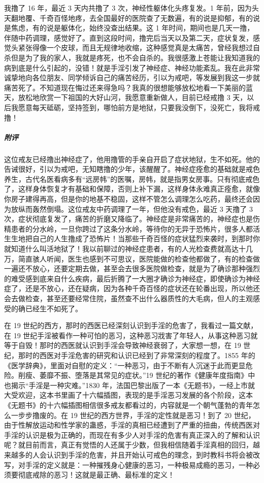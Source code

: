 \begin{case}
    我撸了 16 年，最近 3 天内共撸了 3 次，神经性躯体化头疼复发。1 年前，因为头天翻地覆、千奇百怪地疼，去全国最好的医院查了无数遍，有的说是抑郁，有的说是焦虑，有的说是躯体化，始终没查出结果。这 1 年时间，期间也是几天一撸，伴随中药调理，感觉好了。直到这段时间，撸完后当天以及第二天，症状复发，感觉头紧张得像一个皮球，而且无规律地收缩，这种感觉真是太痛苦，曾经我想过自杀但是为了我的家人，我就是疼死，也不会自杀的。我很感激上苍能让我知道我的病到底是什么引起的，没错！就是手淫引发了神经症、神经功能紊乱。我在此非常诚挚地向各位朋友、同学倾诉自己的痛苦经历，引以为戒吧，等发展到我这一步就痛苦死了。不知道现在悔过还来得急吗？我真的很想能够放松地看一下美丽的蓝天，放松地欣赏一下祖国的大好山河，我愿意重新做人，目前已经戒撸 3 天，以后我愿意每天砥砺，坚持签到，哪怕前方是地狱，只要我没倒下，没死亡，我将戒撸！
    \subparagraph{附评} 这位戒友已经撸出神经症了，他用撸管的手亲自开启了症状地狱，生不如死。他的告诫很好，引以为戒吧，无知瞎撸的少年，该醒醒了。神经症痊愈的基础就是戒色养生，古代名医看病多有“远房帏”的医嘱，房帏，就是指男女房事。只有彻底戒色了，这样身体恢复才有基础和保障，否则上补下漏，这样身体永难真正痊愈，就像你房子建得再高，但是你的地基不稳固，这样不管怎么调理怎么吃药，最终还会因为放纵而轰然倒塌。这位戒友中药调理了一年，但他没有戒色，最近 3 天撸了 3 次，症状彻底复发了，痛苦的折磨又降临了。神经症是非常痛苦的，神经症也是伤精患者的分水岭，一旦你跨过了这条分水岭，等待你的无异于恐怖片，很多人都活生生地把自己的人生撸成了恐怖片！当那些千奇百怪的症状猛烈来袭时，到那时你就知道什么叫活地狱了！我以前聊过的神经症患者，有的人光检查费就高达十几万，简直骇人听闻，医生也感到不可思议，医院能做的检查他都做了，有的检查做一遍还不放心，还要定期去做，甚至会去很多医院做检查，就是为了确诊那种强烈的难受感到底来自什么疾病，最后折腾了一大圈才确诊为神经症，即使确诊为神经症了，还是不放心，还在疑病，因为各种千奇百怪的症状还在轮番出现，所以他还会去做检查，甚至还要经常住院，虽然查不出什么器质性的大毛病，但人的主观感受的确已经生不如死了。

    在 19 世纪的西方，那时的西医已经深刻认识到手淫的危害了，我看过一篇文献，在 19 世纪手淫被看作一种可怕的恶习，这种恶习戕害了年轻人，从事这种恶习就等于自毁！那时的西医就认识到手淫会导致神经衰弱了，大家想一想，在 19 世纪，那时的西医对手淫危害的研究和认识已经到了非常深刻的程度了。1855 年的《医学辞典》，里面对自慰的定义：“一种恶习，由于不断有人沉迷于此而更显危险。削瘦、萎靡不振、堕落是其常见的症状。”19 世纪的著作《健康年度指南》中也揭示“手淫是一种灾难。”1830 年，法国巴黎出版了一本《无题书》，一经上市就大受欢迎，这本书里画了十六幅插图，表现的是手淫恶习发展的各个阶段，这本《无题书》的十六幅插图相信很多戒友都看过的，内容就是一个朝气蓬勃的青年怎么一步步撸废的。在 19 世纪的西方世界，手淫的定性就是恶习！到了 20 世纪，由于性解放运动和性学家的蛊惑，手淫的真相已经遭到了严重的扭曲，传统西医对手淫的认识是极为正确的，而现在有多少人对手淫的危害有真正深入的了解和认识呢？就目前而言，真正有觉悟的人还属于少数，但我相信随着手淫真相的回归，越来越多的人会认识到手淫的危害，并且开始认可戒色的理念，到时教科书将会被改写，对手淫的定义就是：一种摧残身心健康的恶习，一种极易成瘾的恶习，一种必须要彻底戒除的恶习！这就是最正确、最标准的定义！
\end{case}

